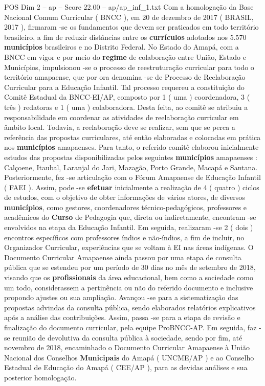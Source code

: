 \begin{textsample}{POS Dim 2 – ap – Score 22.00 – ap/ap\_inf\_1.txt}
Com a homologação da Base Nacional Comum Curricular ( BNCC ), em 20 de dezembro de 2017 ( BRASIL, 2017 ), firmaram -se os fundamentos que devem ser praticados em todo território brasileiro, a fim de reduzir distâncias entre os \textbf{currículos} adotados nos 5.570 \textbf{municípios} brasileiros e no Distrito Federal.
No Estado do Amapá, com a BNCC em vigor e por meio do \textbf{regime} de colaboração entre União, Estado e Municípios, impulsionou -se o processo de reestruturação curricular para todo o território amapaense, que por ora denomina -se de Processo de Reelaboração Curricular para a Educação Infantil.
Tal processo requereu a constituição do Comitê Estadual da BNCC-EI/AP, composto por 1 ( uma ) coordenadora, 3 ( três ) redatoras e 1 ( uma ) colaboradora.
Desta feita, ao comitê se atribuiu a responsabilidade em coordenar as atividades de reelaboração curricular em âmbito local.
Todavia, a reelaboração deve se realizar, sem que se perca a referência das propostas curriculares, até então elaboradas e colocadas em prática nos \textbf{municípios} amapaenses.
Para tanto, o referido comitê elaborou inicialmente estudos das propostas disponibilizadas pelos seguintes \textbf{municípios} amapaenses : Calçoene, Itaubal, Laranjal do Jari, Mazagão, Porto Grande, Macapá e Santana.
Posteriormente, fez -se articulação com o Fórum Amapaense de Educação Infantil ( FAEI ).
Assim, pode -se \textbf{efetuar} inicialmente a realização de 4 ( quatro ) ciclos de estudos, com o objetivo de obter informações de vários atores, de diversos \textbf{municípios}, como gestores, coordenadores técnico-pedagógicos, professores e acadêmicos do \textbf{Curso} de Pedagogia que, direta ou indiretamente, encontram -se envolvidos na etapa da Educação Infantil.
Em seguida, realizaram -se 2 ( dois ) encontros específicos com professores índios e não-índios, a fim de incluir, no Organizador Curricular, experiências que se voltam à EI nas áreas indígenas.
O Documento Curricular Amapaense ainda passou por uma etapa de consulta pública que se estendeu por um período de 30 dias no mês de setembro de 2018, visando que os \textbf{profissionais} da área educacional, bem como a sociedade como um todo, considerassem a pertinência ou não do referido documento e inclusive propondo ajustes ou sua ampliação.
Avançou -se para a sistematização das propostas advindas da consulta pública, sendo elaborados relatórios explicativos após a análise das contribuições.
Assim, passa -se para a etapa de revisão e finalização do documento curricular, pela equipe ProBNCC-AP.
Em seguida, faz -se reunião de devolutiva da consulta pública à sociedade, sendo por fim, até novembro de 2018, encaminhado o Documento Curricular Amapaense à União Nacional dos Conselhos \textbf{Municipais} do Amapá ( UNCME/AP ) e ao Conselho Estadual de Educação do Amapá ( CEE/AP ), para as devidas análises e sua posterior homologação.

\end{textsample}
